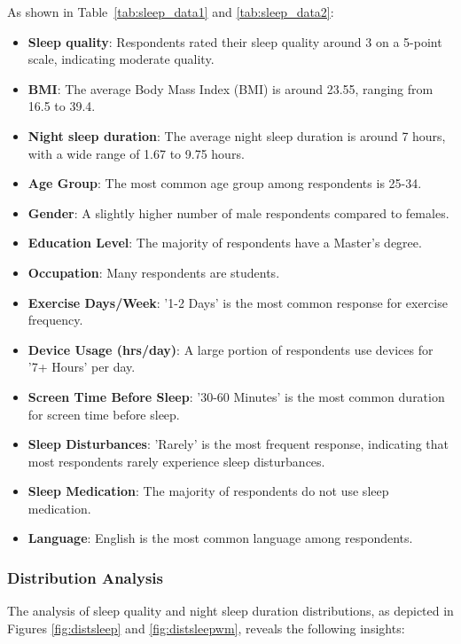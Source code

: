 \documentclass[conference]{IEEEtran}
\begin{document}
As shown in Table~\ref{tab:sleep_data1} and \ref{tab:sleep_data2}:
\begin{itemize}
    \item \textbf{Sleep quality}: Respondents rated their sleep quality around 3 on a 5-point scale, indicating moderate quality.
    \item \textbf{BMI}: The average Body Mass Index (BMI) is around 23.55, ranging from 16.5 to 39.4.
    \item \textbf{Night sleep duration}: The average night sleep duration is around 7 hours, with a wide range of 1.67 to 9.75 hours.\item \textbf{Age Group}: The most common age group among respondents is 25-34.
    \item \textbf{Gender}: A slightly higher number of male respondents compared to females.
    \item \textbf{Education Level}: The majority of respondents have a Master's degree.
    \item \textbf{Occupation}: Many respondents are students.
    \item \textbf{Exercise Days/Week}: '1-2 Days' is the most common response for exercise frequency.
    \item \textbf{Device Usage (hrs/day)}: A large portion of respondents use devices for '7+ Hours' per day.
    \item \textbf{Screen Time Before Sleep}: '30-60 Minutes' is the most common duration for screen time before sleep.
    \item \textbf{Sleep Disturbances}: 'Rarely' is the most frequent response, indicating that most respondents rarely experience sleep disturbances.
    \item \textbf{Sleep Medication}: The majority of respondents do not use sleep medication.
    \item \textbf{Language}: English is the most common language among respondents.

\end{itemize}

\subsubsection*{Distribution Analysis}
The analysis of sleep quality and night sleep duration distributions, as depicted in Figures \ref{fig:distsleep} and \ref{fig:distsleepwm}, reveals the following insights:
\end{document}

